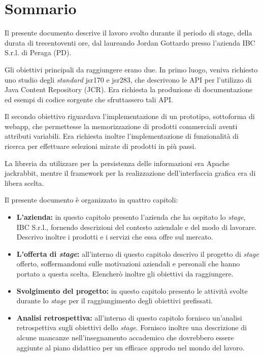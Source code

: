 
\cleardoublepage
{}
{}
\begingroup
\let\clearpage\relax
\let\cleardoublepage\relax
\let\cleardoublepage\relax

\chapter*{Sommario}

Il presente documento descrive il lavoro svolto durante il periodo di stage, della durata di trecentoventi ore, dal laureando Jordan Gottardo presso l'azienda IBC S.r.l. di Peraga (PD).


Gli obiettivi principali da raggiungere erano due. In primo luogo, veniva richiesto uno studio degli \textit{standard} \gls{jsr170} e \gls{jsr283}, che descrivono le API per l'utilizzo di Java Content Repository (JCR). Era richiesta la produzione di documentazione ed esempi di codice sorgente che sfruttassero tali API. 


Il secondo obiettivo riguardava l'implementazione di un prototipo, sottoforma di \gls{webapp}, che permettesse la memorizzazione di prodotti commerciali aventi attributi variabili. Era richiesta inoltre l'implementazione di funzionalità di ricerca per effettuare selezioni mirate di prodotti in più passi.


La libreria da utilizzare per la persistenza delle informazioni era Apache \gls{jackrabbit}, mentre il \gls{framework} per la realizzazione dell'interfaccia grafica era di libera scelta.


Il presente documento è organizzato in quattro capitoli:
\begin{itemize}
	\item \textbf{L'azienda:} in questo capitolo presento l'azienda che ha ospitato lo \textit{stage}, IBC S.r.l., fornendo descrizioni del contesto aziendale e del modo di lavorare. Descrivo inoltre i prodotti e i servizi che essa offre sul mercato.
	\item \textbf{L'offerta di \textit{stage}:} all'interno di questo capitolo descrivo il progetto di \textit{stage} offerto, soffermandomi sulle motivazioni aziendali e personali che hanno portato a questa scelta. Elencherò inoltre gli obiettivi da raggiungere.
	\item \textbf{Svolgimento del progetto:} in questo capitolo presento le attività svolte durante lo \textit{stage} per il raggiungimento degli obiettivi prefissati.
	\item \textbf{Analisi retrospettiva:}  all'interno di questo capitolo fornisco un'analisi retrospettiva sugli obiettivi dello \textit{stage}. Fornisco inoltre una descrizione di alcune mancanze nell'insegnamento accademico che dovrebbero essere aggiunte al piano didattico per un efficace approdo nel mondo del lavoro.
\end{itemize}

